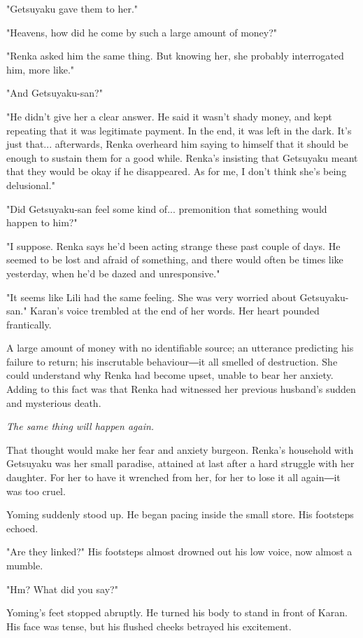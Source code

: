 "Getsuyaku gave them to her."

"Heavens, how did he come by such a large amount of money?"

"Renka asked him the same thing. But knowing her, she probably
interrogated him, more like."

"And Getsuyaku-san?"

"He didn't give her a clear answer. He said it wasn't shady money, and
kept repeating that it was legitimate payment. In the end, it was left
in the dark. It's just that... afterwards, Renka overheard him saying to
himself that it should be enough to sustain them for a good while.
Renka's insisting that Getsuyaku meant that they would be okay if he
disappeared. As for me, I don't think she's being delusional."

"Did Getsuyaku-san feel some kind of... premonition that something would
happen to him?"

"I suppose. Renka says he'd been acting strange these past couple of
days. He seemed to be lost and afraid of something, and there would
often be times like yesterday, when he'd be dazed and unresponsive."

"It seems like Lili had the same feeling. She was very worried about
Getsuyaku-san." Karan's voice trembled at the end of her words. Her
heart pounded frantically.

A large amount of money with no identifiable source; an utterance
predicting his failure to return; his inscrutable behaviour―it all
smelled of destruction. She could understand why Renka had become upset,
unable to bear her anxiety. Adding to this fact was that Renka had
witnessed her previous husband's sudden and mysterious death.

\emph{The same thing will happen again.}

That thought would make her fear and anxiety burgeon. Renka's household
with Getsuyaku was her small paradise, attained at last after a hard
struggle with her daughter. For her to have it wrenched from her, for
her to lose it all again―it was too cruel.

Yoming suddenly stood up. He began pacing inside the small store. His
footsteps echoed.

"Are they linked?" His footsteps almost drowned out his low voice, now
almost a mumble.

"Hm? What did you say?"

Yoming's feet stopped abruptly. He turned his body to stand in front of
Karan. His face was tense, but his flushed cheeks betrayed his
excitement.

